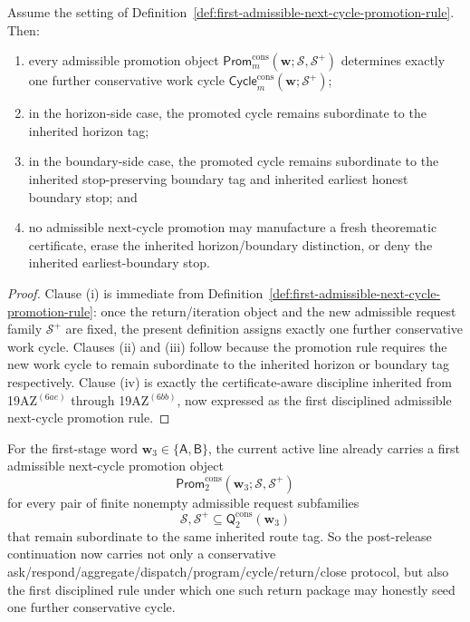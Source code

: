 \begin{proposition}
\label{prop:every-admissible-next-cycle-promotion-object-seeds-exactly-one-further-conservative-work-cycle-under-the-inherited-route-tag}
Assume the setting of Definition~\ref{def:first-admissible-next-cycle-promotion-rule}. Then:
\begin{enumerate}[label=(\roman*)]
  \item every admissible promotion object \(\mathsf{Prom}^{\mathrm{cons}}_{m}(\mathbf w;\mathcal S,\mathcal S^{+})\) determines exactly one further conservative work cycle \(\mathsf{Cycle}^{\mathrm{cons}}_{m}(\mathbf w;\mathcal S^{+})\);
  \item in the horizon-side case, the promoted cycle remains subordinate to the inherited horizon tag;
  \item in the boundary-side case, the promoted cycle remains subordinate to the inherited stop-preserving boundary tag and inherited earliest honest boundary stop; and
  \item no admissible next-cycle promotion may manufacture a fresh theorematic certificate, erase the inherited horizon/boundary distinction, or deny the inherited earliest-boundary stop.
\end{enumerate}
\end{proposition}

\begin{proof}
Clause (i) is immediate from Definition~\ref{def:first-admissible-next-cycle-promotion-rule}: once the return/iteration object and the new admissible request family \(\mathcal S^{+}\) are fixed, the present definition assigns exactly one further conservative work cycle. Clauses (ii) and (iii) follow because the promotion rule requires the new work cycle to remain subordinate to the inherited horizon or boundary tag respectively. Clause (iv) is exactly the certificate-aware discipline inherited from 19AZ$^{(6ae)}$ through 19AZ$^{(6bb)}$, now expressed as the first disciplined admissible next-cycle promotion rule.
\end{proof}

\begin{corollary}
\label{cor:the-present-post-v3290-line-already-carries-a-first-admissible-next-cycle-promotion-rule}
For the first-stage word \(\mathbf w_3\in\{\mathsf A,\mathsf B\}\), the current active line already carries a first admissible next-cycle promotion object
\[
  \mathsf{Prom}^{\mathrm{cons}}_{2}(\mathbf w_3;\mathcal S,\mathcal S^{+})
\]
for every pair of finite nonempty admissible request subfamilies
\[
  \mathcal S,\mathcal S^{+}\subseteq \mathsf{Q}^{\mathrm{cons}}_{2}(\mathbf w_3)
\]
that remain subordinate to the same inherited route tag. So the post-release continuation now carries not only a conservative ask/respond/aggregate/dispatch/program/cycle/return/close protocol, but also the first disciplined rule under which one such return package may honestly seed one further conservative cycle.
\end{corollary}

